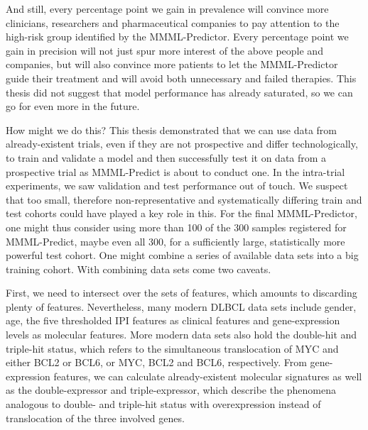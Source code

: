 And still, every percentage point we gain in prevalence will convince more clinicians, researchers 
and pharmaceutical companies to pay attention to the high-risk group identified by the MMML-Predictor.
Every percentage point we gain in precision will not just spur more interest of the above people and 
companies, but will also convince more patients to let the MMML-Predictor guide their treatment and 
will avoid both unnecessary and failed therapies. This thesis did not suggest that model performance 
has already saturated, so we can go for even more in the future.

How might we do this? This thesis demonstrated that we can use data from already-existent trials, 
even if they are not prospective and differ technologically, to train and validate a model and 
then successfully test it on data from a prospective trial as MMML-Predict is about to conduct one.
In the intra-trial experiments, we saw validation and test performance out of touch. We suspect 
that too small, therefore non-representative and systematically differing train and test cohorts 
could have played a key role in this. For the final MMML-Predictor, one might thus consider 
using more than \num{100} of the \num{300} samples registered for MMML-Predict, maybe even all 
\num{300}, for a sufficiently large, statistically more powerful test cohort. One might combine 
a series of available data sets into a big training cohort. With combining data sets come two 
caveats. 

First, we need to intersect over the sets of features, which amounts to discarding plenty 
of features. Nevertheless, many modern DLBCL data sets include gender, age, the five thresholded 
IPI features as clinical features and gene-expression levels as molecular features. More modern data 
sets also hold the double-hit and triple-hit status, which refers to the simultaneous translocation 
of MYC and either BCL2 or BCL6, or MYC, BCL2 and BCL6, respectively. From gene-expression 
features, we can calculate already-existent molecular signatures as well as the double-expressor and 
triple-expressor, which describe the phenomena analogous to double- and triple-hit status with 
overexpression instead of translocation of the three involved genes.

